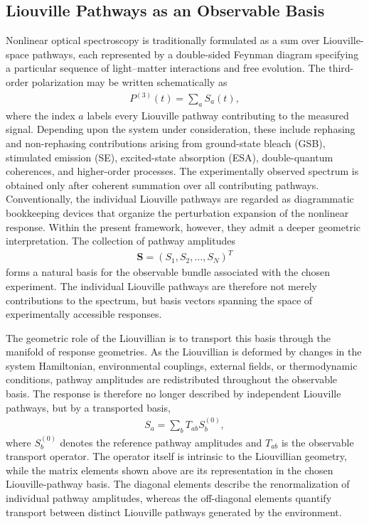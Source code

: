 \subsection{Liouville Pathways as an Observable Basis}
\label{subsec:pathway_basis}
Nonlinear optical spectroscopy is traditionally formulated as a
sum over Liouville-space pathways, each represented by a
double-sided Feynman diagram specifying a particular sequence of
light--matter interactions and free evolution. The third-order
polarization may be written schematically as
%
\begin{align}
P^{(3)}(t)
=
\sum_a
S_a(t),
\label{eq:P3sum}
\end{align}
%
where the index $a$ labels every Liouville pathway contributing
to the measured signal. Depending upon the system under
consideration, these include rephasing and non-rephasing
contributions arising from ground-state bleach (GSB), stimulated
emission (SE), excited-state absorption (ESA), double-quantum
coherences, and higher-order processes. The experimentally
observed spectrum is obtained only after coherent summation over
all contributing pathways.
Conventionally, the individual Liouville pathways are regarded as
diagrammatic bookkeeping devices that organize the perturbation
expansion of the nonlinear response. Within the present
framework, however, they admit a deeper geometric
interpretation. The collection of pathway amplitudes
%
\begin{align}
\mathbf{S}
=
\left(
S_1,
S_2,
\ldots,
S_N
\right)^T
\end{align}
%
forms a natural basis for the observable bundle associated with
the chosen experiment. The individual Liouville pathways are
therefore not merely contributions to the spectrum, but basis
vectors spanning the space of experimentally accessible
responses.

The geometric role of the Liouvillian is to transport this basis
through the manifold of response geometries. As the Liouvillian
is deformed by changes in the system Hamiltonian, environmental
couplings, external fields, or thermodynamic conditions, pathway
amplitudes are redistributed throughout the observable basis.
The response is therefore no longer described by independent
Liouville pathways, but by a transported basis,
%
\begin{align}
S_a
=
\sum_b
T_{ab}
S_b^{(0)},
\label{eq:Ttransport}
\end{align}
%
where $S_b^{(0)}$ denotes the reference pathway amplitudes and
$T_{ab}$ is the observable transport operator. The operator
itself is intrinsic to the Liouvillian geometry, while the matrix
elements shown above are its representation in the chosen
Liouville-pathway basis. The diagonal elements describe the
renormalization of individual pathway amplitudes, whereas the
off-diagonal elements quantify transport between distinct
Liouville pathways generated by the environment.

